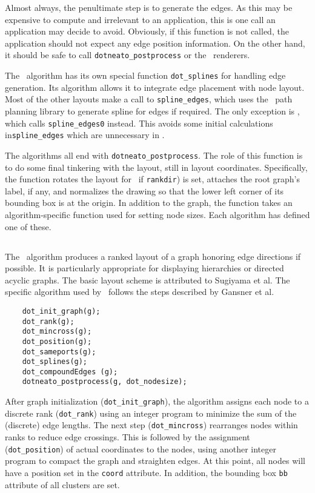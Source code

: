 Almost always, the penultimate step is to generate the edges. As this may
be expensive to compute and irrelevant to an application, this is one
call an application may decide to avoid. Obviously, if this function is
not called, the application should not expect any edge position information.
On the other hand, it should be safe to call {\tt dotneato\_postprocess}
or the \gviz\ renderers.

The \dot\ algorithm has its own special function {\tt dot\_splines}
for handling edge generation. Its algorithm allows it to integrate
edge placement with node layout. Most of the other layouts make a call
to {\tt spline\_edges}, which uses the \gviz\ path planning library
to generate spline for edges if required. The only exception is
\fdp, which calls {\tt spline\_edges0} instead. This avoids some initial
calculations in{\tt spline\_edges} which are unnecessary in \fdp.

The algorithms all end with {\tt dotneato\_postprocess}.
The role of this function is to do some final tinkering with the
layout, still in layout coordinates. Specifically, the function
rotates the layout for \dot\ if {\tt rankdir}) is set,
attaches the root graph's label, if any, and normalizes the drawing
so that the lower left corner of its bounding box is at the origin. In
addition to the graph, the function takes an algorithm-specific
function used for setting node sizes. Each algorithm has defined
one of these.

\subsection{\dot}

The \dot\ algorithm produces a ranked layout of a graph honoring
edge directions if possible. It is particularly appropriate for displaying
hierarchies or directed acyclic graphs. The basic layout scheme
is attributed to Sugiyama et al.\cite{stt} The specific algorithm
used by \dot\ follows the steps described by Gansner et al.\cite{gknv:methods}

\begin{verbatim}
    dot_init_graph(g);
    dot_rank(g);
    dot_mincross(g);
    dot_position(g);
    dot_sameports(g);
    dot_splines(g);
    dot_compoundEdges (g);
    dotneato_postprocess(g, dot_nodesize);
\end{verbatim}

After graph initialization ({\tt dot\_init\_graph}), the algorithm
assigns each node to a discrete rank ({\tt dot\_rank})
using an integer program to minimize the sum of the (discrete) edge lengths. 
The next step ({\tt dot\_mincross}) rearranges nodes within ranks to
reduce edge crossings. This is followed by the assignment ({\tt dot\_position})
of actual coordinates to the nodes, using another integer program to
compact the graph and straighten edges. At this point, all nodes will
have a position set in the {\tt coord} attribute. In addition, the
bounding box {\tt bb} attribute of all clusters are set.

